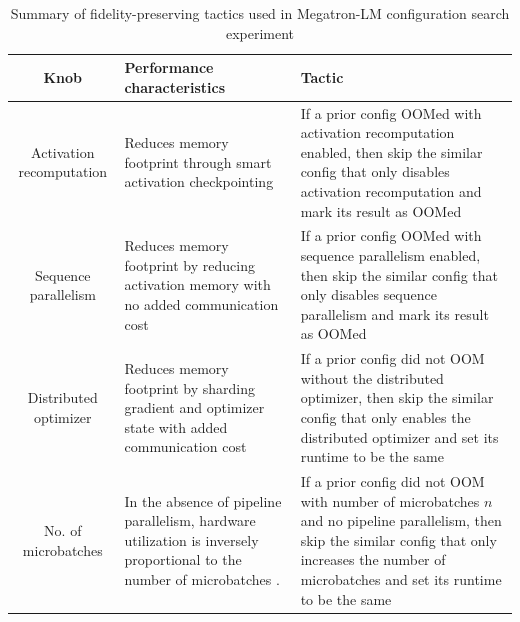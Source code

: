 \begin{table}[t]
\centering
\begin{tabular}{c p{} p{}}
\toprule
\textbf{Knob} & \textbf{Performance characteristics} & \textbf{Tactic} \\
\midrule
Activation recomputation & Reduces memory footprint through smart activation checkpointing 
 & If a prior config OOMed with activation recomputation enabled, then skip the similar config that only disables activation recomputation and mark its result as OOMed \\ 
Sequence parallelism & Reduces memory footprint by reducing activation memory with no added communication cost & If a prior config OOMed with sequence parallelism enabled, then skip the similar config that only disables sequence parallelism and mark its result as OOMed \\
Distributed optimizer & Reduces memory footprint by sharding gradient and optimizer state with added communication cost & If a prior config did not OOM without the distributed optimizer, then skip the similar config that only enables the distributed optimizer and set its runtime to be the same \\
No. of microbatches & In the absence of pipeline parallelism, hardware utilization is inversely proportional to the number of microbatches \cite{megatron}. & If a prior config did not OOM with number of microbatches $n$ and no pipeline parallelism, then skip the similar config that only increases the number of microbatches and set its runtime to be the same \\
\bottomrule
\end{tabular}
\caption{Summary of fidelity-preserving tactics used in Megatron-LM configuration search experiment}
\label{table:fidelity-preserving-tactics}
\end{table}
